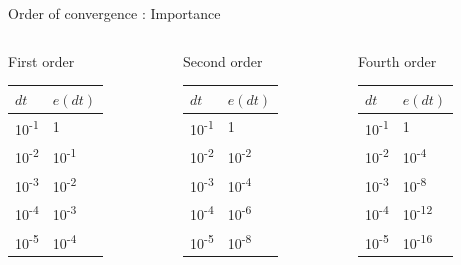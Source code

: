 \documentclass[presentation]{beamer}
\begin{document}
\begin{frame}[label={sec:orgd2fc830}]{Order of convergence : Importance}
\begin{columns}
\begin{column}{0.4\columnwidth}
\begin{block}{First order}
\begin{center}
\begin{tabular}{ll}
\toprule
\(dt\) & \(e(dt)\)\\
\midrule
10\textsuperscript{-1} & 1\\
10\textsuperscript{-2} & 10\textsuperscript{-1}\\
10\textsuperscript{-3} & 10\textsuperscript{-2}\\
10\textsuperscript{-4} & 10\textsuperscript{-3}\\
10\textsuperscript{-5} & 10\textsuperscript{-4}\\
\bottomrule
\end{tabular}
\end{center}
\end{block}
\end{column}
\begin{column}{0.4\columnwidth}
\begin{block}{Second order}
\begin{center}
\begin{tabular}{ll}
\toprule
\(dt\) & \(e(dt)\)\\
\midrule
10\textsuperscript{-1} & 1\\
10\textsuperscript{-2} & 10\textsuperscript{-2}\\
10\textsuperscript{-3} & 10\textsuperscript{-4}\\
10\textsuperscript{-4} & 10\textsuperscript{-6}\\
10\textsuperscript{-5} & 10\textsuperscript{-8}\\
\bottomrule
\end{tabular}
\end{center}
\end{block}
\end{column}
\begin{column}{0.4\columnwidth}
\begin{block}{Fourth order}
\begin{center}
\begin{tabular}{ll}
\toprule
\(dt\) & \(e(dt)\)\\
\midrule
10\textsuperscript{-1} & 1\\
10\textsuperscript{-2} & 10\textsuperscript{-4}\\
10\textsuperscript{-3} & 10\textsuperscript{-8}\\
10\textsuperscript{-4} & 10\textsuperscript{-12}\\
10\textsuperscript{-5} & 10\textsuperscript{-16}\\
\bottomrule
\end{tabular}
\end{center}
\end{block}
\end{column}
\end{columns}
\end{frame}
\end{document}
